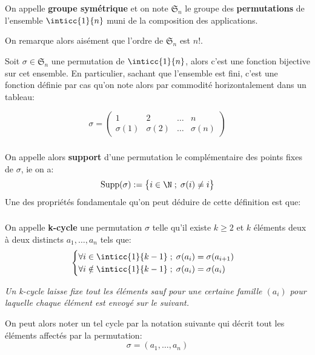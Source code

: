 \chapter*{}
On appelle \textbf{groupe symétrique} et on note \(\mathfrak{S}_n\) le groupe des \textbf{permutations} de l'ensemble \(\inticc{1}{n}\) muni de la composition des applications.\<

On remarque alors aisément que l'ordre de \(\mathfrak{S}_n\) est \(n!\).\<

Soit \(\sigma \in \mathfrak{S}_n\) une permutation de \(\inticc{1}{n}\), alors c'est une fonction bijective sur cet ensemble. En particulier, sachant que l'ensemble est fini, c'est une fonction définie par cas qu'on note alors par commodité horizontalement dans un tableau:

\[
   \sigma =  \begin{pmatrix}
      1 & 2 & \ldots & n\\
      \sigma(1) & \sigma(2) & \ldots & \sigma(n)
   \end{pmatrix}
\]

\subsection*{}
On appelle alors \textbf{support} d'une permutation le complémentaire des points fixes de \(\sigma\), ie on a:
\[
   \text{Supp}(\sigma) := \bigl\{ i \in \N \; ; \; \sigma(i) \neq i \bigl\}   
\]
Une des propriétés fondamentale qu'on peut déduire de cette définition est que:
\subsection*{}
On appelle \textbf{k-cycle} une permutation \(\sigma\) telle qu'il existe \(k \geq 2\) et \(k\) éléments deux à deux distincts \(a_1, \ldots, a_n\) tels que:
\[
   \begin{cases}
      \forall i \in \inticc{1}{k-1} \; ; \; \sigma(a_i) = \sigma(a_{i+1}) \\
      \forall i \notin \inticc{1}{k-1} \; ; \; \sigma(a_i) = \sigma(a_{i})
   \end{cases} 
\]
\begin{center}
   \textit{Un k-cycle laisse fixe tout les éléments sauf pour une certaine famille \((a_i)\) pour laquelle chaque élément est envoyé sur le suivant.}
\end{center}
On peut alors noter un tel cycle par la notation suivante qui décrit tout les éléments affectés par la permutation:
\[
   \sigma = (a_1, \ldots, a_n)  
\]

